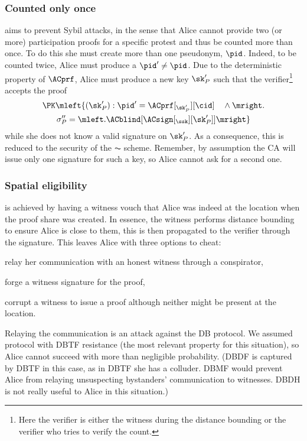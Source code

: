 \subsubsection{Counted only once}%
\label{analysis-linkability}

 aims to prevent Sybil attacks, in the sense
that Alice cannot provide two (or more) participation proofs for a
specific protest and thus be counted more than once.
To do this she must create more than one pseudonym, \(\pid\).
Indeed, to be counted twice, Alice must produce a \(\pid'\neq \pid\).
Due to the deterministic property of \(\ACprf\), Alice must produce a new key 
\(\sk_P'\) such that the verifier\footnote{%
  Here the verifier is either the witness during the distance bounding or the 
  verifier who tries to verify the count.
} accepts the proof
\begin{multline*}
\PK\mleft\{ (\sk_P') : \pid' = \ACprf[_{\sk_P'}][\cid] \quad \land \mright. \\
    \sigma_P'' = \mleft. \ACblind[\ACsign[_{\ssk}][\sk_P']] \mright\}
\end{multline*}
while she does not know a valid signature on \(\sk_P'\).
As a consequence, this is reduced to the security of the \(\AC\) scheme.
Remember, by assumption the \ac{CA} will issue only one signature for such a 
key, so Alice cannot ask for a second one.

\subsubsection{Spatial eligibility}%
\label{analysis-spatial}

 is achieved by having a witness vouch that Alice was 
indeed at the location when the proof share was created.
In essence, the witness performs distance bounding to ensure Alice is close to 
them, this is then propagated to the verifier through the signature.
This leaves Alice with three options to cheat:
\begin{enumerate*}
\item\label{spatial-DF} relay her communication with an honest witness through 
  a conspirator,
\item\label{spatial-forge} forge a witness signature for the proof,
\item corrupt a witness to issue a proof although neither might be present at 
  the location.
\end{enumerate*}

Relaying the communication is an attack against the \ac{DB} protocol.
We assumed  protocol with \ac{DBTF} resistance (the most relevant 
property for this situation), so Alice cannot succeed with more than negligible 
probability.
(\Ac{DBDF} is captured by \ac{DBTF} in this case, as in \ac{DBTF} she has a 
colluder.
\Ac{DBMF} would prevent Alice from relaying unsuspecting bystanders' 
communication to witnesses.
\ac{DBDH} is not really useful to Alice in this situation.)
 
